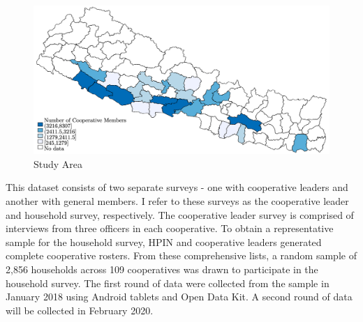 \documentclass[11pt]{article}
\begin{document}
\begin{figure}[!h]
    \caption{Study Area}
    \label{map}
    \noindent \centering \includegraphics[width=.75\textwidth]{StudyMap.png}
\end{figure}

This dataset consists of two separate surveys - one with cooperative leaders and another with general members.  I refer to these surveys as the cooperative leader and household survey, respectively. The cooperative leader survey is comprised of interviews from three officers in each cooperative. To obtain a representative sample for the household survey, HPIN and cooperative leaders generated complete cooperative rosters. From these comprehensive lists, a random sample of 2,856 households across 109 cooperatives was drawn to participate in the household survey. The first round of data were collected from the sample in January 2018 using Android tablets and Open Data Kit. A second round of data will be collected in February 2020.
\end{document}
